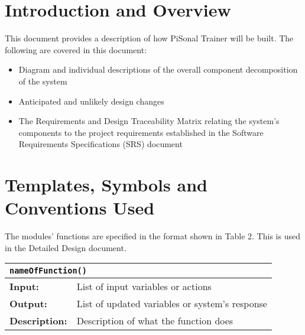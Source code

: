 \documentclass{article}
\newcommand{\name}[1]{\hline \multicolumn{2}{|l|}{\texttt{#1}} }
\newcommand{\inp}[1]{\hline \textbf{Input:} & #1}
\newcommand{\out}[1]{\hline \textbf{Output:} & #1}
\newcommand{\desc}[1]{\hline \textbf{Description:} & #1 }
\newcommand{\fcn}[4]{
    \begin{center}
    \begin{tabular}{|p{2cm} p{10cm}|}
    \hline
    \name{#1} \\
    \inp{#2} \\
    \out{#3} \\
    \desc{#4} \\
    \hline
    \end{tabular}
    \end{center}
}
\begin{document}
\section{Introduction and Overview}
This document provides a description of how PiSonal Trainer will be built. The following are covered in this document:
\begin{itemize}
    \item Diagram and individual descriptions of the overall component decomposition of the system
    \item Anticipated and unlikely design changes
    \item The Requirements and Design Traceability Matrix relating the system’s components to the project requirements established in the Software Requirements Specifications (SRS) document
\end{itemize}

\section{Templates, Symbols and Conventions Used}
The modules' functions are specified in the format shown in Table 2. This is used in the Detailed Design document.

\begingroup
\begin{center}
\fcn
{nameOfFunction()}
{List of input variables or actions}
{List of updated variables or system's response}
{Description of what the function does}
\end{center}
\endgroup
\end{document}
